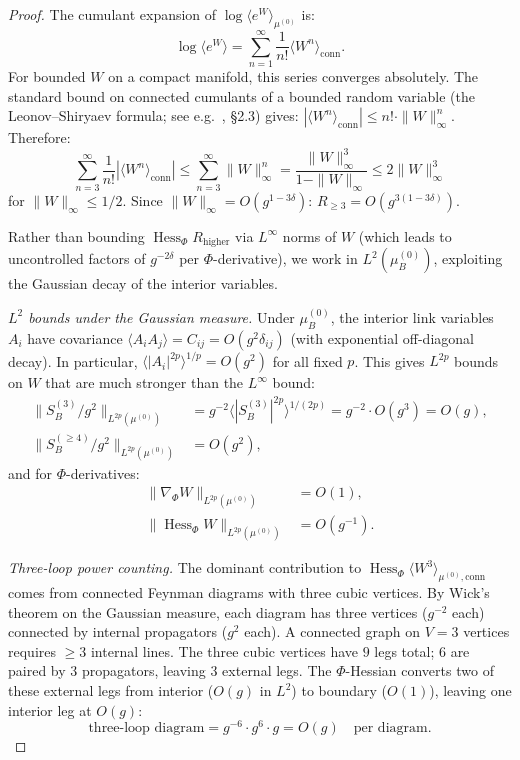 \documentclass[11pt,a4paper]{article}
\theoremstyle{plain}
\theoremstyle{definition}
\theoremstyle{remark}
\newcommand{\Hess}{\operatorname{Hess}}
\begin{document}
\begin{proof}
The cumulant expansion of $\log\langle e^W
\rangle_{\mu^{(0)}}$ is:
\begin{equation}
  \log\langle e^W\rangle
  = \sum_{n=1}^{\infty} \frac{1}{n!}
  \langle W^n \rangle_{\mathrm{conn}}.
\end{equation}
For bounded $W$ on a compact manifold, this series
converges absolutely. The standard bound on connected
cumulants of a bounded random variable (the
Leonov--Shiryaev formula; see e.g.~\cite{Ledoux},
\S2.3) gives:
$|\langle W^n \rangle_{\mathrm{conn}}|
\le n! \cdot \|W\|_\infty^n$. Therefore:
\begin{equation}
  \sum_{n=3}^{\infty} \frac{1}{n!}
  |\langle W^n \rangle_{\mathrm{conn}}|
  \le \sum_{n=3}^{\infty} \|W\|_\infty^n
  = \frac{\|W\|_\infty^3}{1 - \|W\|_\infty}
  \le 2\|W\|_\infty^3
\end{equation}
for $\|W\|_\infty \le 1/2$.
Since $\|W\|_\infty = O(g^{1-3\delta})$:
$R_{\ge 3} = O(g^{3(1-3\delta)})$.

Rather than bounding $\Hess_\Phi R_{\mathrm{higher}}$
via $L^\infty$ norms of $W$ (which leads to
uncontrolled factors of $g^{-2\delta}$ per
$\Phi$-derivative), we work in $L^2(\mu_B^{(0)})$,
exploiting the Gaussian decay of the interior variables.

\emph{$L^2$ bounds under the Gaussian measure.}
Under $\mu_B^{(0)}$, the interior link variables
$A_i$ have covariance $\langle A_i A_j\rangle
= C_{ij} = O(g^2\delta_{ij})$ (with exponential
off-diagonal decay). In particular,
$\langle|A_i|^{2p}\rangle^{1/p} = O(g^2)$
for all fixed $p$. This gives $L^{2p}$ bounds on $W$
that are much stronger than the $L^\infty$ bound:
\begin{align}
  \|S_B^{(3)}/g^2\|_{L^{2p}(\mu^{(0)})}
  &= g^{-2}\bigl\langle|S_B^{(3)}|^{2p}
  \bigr\rangle^{1/(2p)}
  = g^{-2}\cdot O(g^3) = O(g), \label{eq:W_L2p}\\
  \|S_B^{(\ge 4)}/g^2\|_{L^{2p}(\mu^{(0)})}
  &= O(g^2), \nonumber
\end{align}
and for $\Phi$-derivatives:
\begin{align}
  \|\nabla_\Phi W\|_{L^{2p}(\mu^{(0)})}
  &= O(1),  \label{eq:DW_L2p}\\
  \|\Hess_\Phi W\|_{L^{2p}(\mu^{(0)})}
  &= O(g^{-1}). \label{eq:DDW_L2p}
\end{align}

\emph{Three-loop power counting.}
The dominant contribution to
$\Hess_\Phi\langle W^3\rangle_{\mu^{(0)},\mathrm{conn}}$
comes from connected Feynman diagrams with three
cubic vertices. By Wick's theorem on the Gaussian
measure, each diagram has three vertices ($g^{-2}$ each)
connected by internal propagators ($g^2$ each). A
connected graph on $V = 3$ vertices requires $\ge 3$
internal lines. The three cubic vertices have $9$ legs
total; $6$ are paired by $3$ propagators, leaving $3$
external legs. The $\Phi$-Hessian converts two of these
external legs from interior ($O(g)$ in $L^2$) to boundary
($O(1)$), leaving one interior leg at $O(g)$:
\begin{equation}
  \text{three-loop diagram} = g^{-6}\cdot g^6 \cdot g
  = O(g) \quad\text{per diagram}.
\end{equation}


\end{proof}
\end{document}
